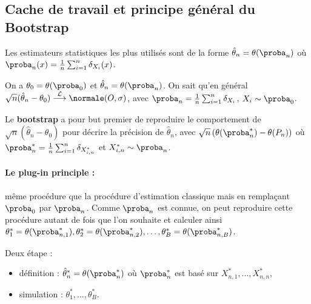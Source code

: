 \subsection{Cache de travail et principe général du Bootstrap}

	Les estimateurs statistiques les plus utilisés sont de la forme $\hat{\theta}_n = \theta(\proba_n)$ où $\proba_n(x) = \frac{1}{n} \sum_{i = 1}^n \delta_{X_i}(x)$.

	On a $\theta_0 = \theta(\proba_0)$ et $\hat{\theta}_n = \theta(\proba_n)$.
	On sait qu'en général $\sqrt{n}(\hat{\theta}_n - \theta_0) \overset{\mathcal{L}}{\longrightarrow} \normale(O,\sigma)$, avec $\proba_n = \frac{1}{n} \sum_{i = 1}^n \delta_{X_i}$, $X_i \sim \proba_0$.

	\begin{defn}
		Le \textbf{bootstrap} a pour but premier de reproduire le comportement de $\sqrt{n}(\hat{\theta}_n - \theta_0)$ pour décrire la précision de $\hat{\theta}_n$, avec $\sqrt{n} \left( \theta(\proba_n^*) - \theta(P_n) \right)$ où $\proba_n^* = \frac{1}{n} \sum_{i = 1}^n \delta_{X_{i,n}^*}$ et $X_{i,n}^* \sim \proba_n$.
	\end{defn}

	\paragraph{Le plug-in principle :} même procédure que la procédure d'estimation classique mais en remplaçant $\proba_0$ par $\proba_n$.
	Comme $\proba_n$ est connue, on peut reproduire cette procédure autant de fois que l'on souhaite et calculer ainsi $\theta_1^* = \theta(\proba_{n,1}^*), \theta_2^* = \theta(\proba_{n,2}^*), \ldots, \theta_B^* = \theta(\proba_{n,B}^*)$.

	Deux étape :
	\begin{itemize}
		\item[\textbullet] définition : $\hat{\theta}_n^* = \theta(\proba_n^*)$ où $\proba_n^*$ est basé sur $X_{n,1}^*,\ldots,X_{n,n}^*$,
		\item[\textbullet] simulation : $\theta_1^*, \ldots, \theta_B^*$.
	\end{itemize}

